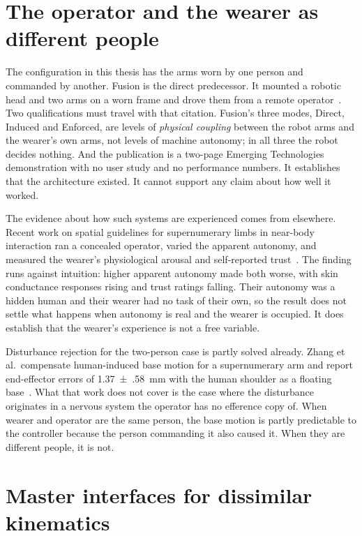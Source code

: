 \section{The operator and the wearer as different people}

The configuration in this thesis has the arms worn by one person and commanded
by another. Fusion is the direct predecessor. It mounted a robotic head and
two arms on a worn frame and drove them from a remote
operator~\cite{saraiji2018fusion}. Two qualifications must travel with that
citation. Fusion's three modes, Direct, Induced and Enforced, are levels of
\emph{physical coupling} between the robot arms and the wearer's own arms, not
levels of machine autonomy; in all three the robot decides nothing. And the
publication is a two-page Emerging Technologies demonstration with no user
study and no performance numbers. It establishes that the architecture
existed. It cannot support any claim about how well it worked.

The evidence about how such systems are experienced comes from elsewhere.
Recent work on spatial guidelines for supernumerary limbs in near-body
interaction ran a concealed operator, varied the apparent autonomy, and
measured the wearer's physiological arousal and self-reported
trust~\cite{zhou2026proxemics}. The finding runs against intuition: higher
apparent autonomy made both worse, with skin conductance responses rising and
trust ratings falling. Their autonomy was a hidden human and their wearer had
no task of their own, so the result does not settle what happens when autonomy
is real and the wearer is occupied. It does establish that the wearer's
experience is not a free variable.

Disturbance rejection for the two-person case is partly solved already. Zhang
et al.\ compensate human-induced base motion for a supernumerary arm and
report end-effector errors of \SI{1.37(58)}{\milli\metre} with the human
shoulder as a floating base~\cite{zhang2024motioncomp}. What that work does
not cover is the case where the disturbance originates in a nervous system the
operator has no efference copy of. When wearer and operator are the same
person, the base motion is partly predictable to the controller because the
person commanding it also caused it. When they are different people, it is not.

\section{Master interfaces for dissimilar kinematics}

